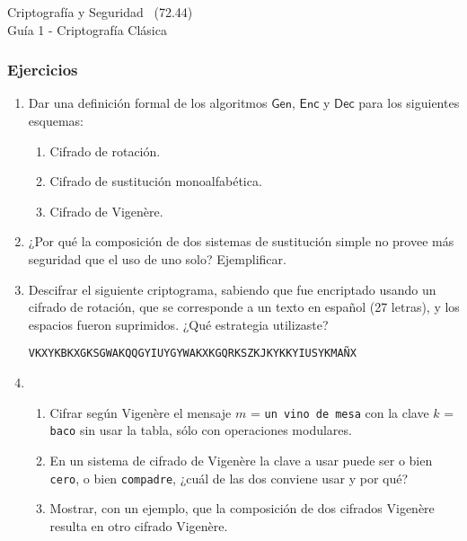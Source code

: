 \documentclass[]{book}
\theoremstyle{definition}
\begin{document}
\begin{center}
  {\Large Criptografía y Seguridad \the\year~(72.44)\\[.2cm]
Guía 1 - Criptografía Clásica}\\
\end{center}

\vspace{0.2 cm}


\subsubsection*{Ejercicios}
\begin{enumerate}
\item\label{norms}
  Dar una definición formal de los algoritmos $\mathsf{Gen}$, $\mathsf{Enc}$ y
  $\mathsf{Dec}$ para los siguientes esquemas: 
\begin{enumerate}
  \item Cifrado de rotación.
  \item Cifrado de sustitución monoalfabética.
  \item Cifrado de Vigenère.
\end{enumerate}

\item ¿Por qué la composición de dos sistemas de sustitución simple no provee más seguridad que el uso de uno solo? Ejemplificar. 

\item Descifrar el siguiente criptograma, sabiendo que fue encriptado usando un
  cifrado de rotación, que se corresponde a un texto en español (27 letras), y
  los espacios fueron suprimidos. ¿Qué estrategia utilizaste? 
\begin{center}
\verb+VKXYKBKXGKSGWAKQQGYIUYGYWAKXKGQRKSZKJKYKKYIUSYKMAÑX+
\end{center}

\item 
  \begin{enumerate}
    \item Cifrar según Vigenère el mensaje $m$ = \verb+un vino de mesa+ con la clave
      $k$ = \verb+baco+ sin usar la tabla, sólo con operaciones modulares.
    \item En un sistema de cifrado de Vigenère la clave a usar puede ser o bien
      \verb+cero+, o bien \verb+compadre+, ¿cuál de las dos conviene usar y por qué?
    \item Mostrar, con un ejemplo, que la composición de dos cifrados Vigenère resulta en otro cifrado Vigenère.
  \end{enumerate}


\end{enumerate}
\end{document}
